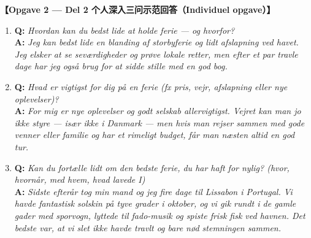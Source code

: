 

\begin{answerbox}
\textbf{\color{NCDRed}【Opgave 2 --- Del 2 个人深入三问示范回答（Individuel opgave）】}
\begin{enumerate}
  \item \textbf{Q:} \textit{Hvordan kan du bedst lide at holde ferie --- og hvorfor?}\\
  \textbf{A:} \textit{Jeg kan bedst lide en blanding af storbyferie og lidt afslapning ved havet. Jeg elsker at se seværdigheder og prøve lokale retter, men efter et par travle dage har jeg også brug for at sidde stille med en god bog.}
  \item \textbf{Q:} \textit{Hvad er vigtigst for dig på en ferie (fx pris, vejr, afslapning eller nye oplevelser)?}\\
  \textbf{A:} \textit{For mig er nye oplevelser og godt selskab allervigtigst. Vejret kan man jo ikke styre --- især ikke i Danmark --- men hvis man rejser sammen med gode venner eller familie og har et rimeligt budget, får man næsten altid en god tur.}
  \item \textbf{Q:} \textit{Kan du fortælle lidt om den bedste ferie, du har haft for nylig? (hvor, hvornår, med hvem, hvad lavede I)}\\
  \textbf{A:} \textit{Sidste efterår tog min mand og jeg fire dage til Lissabon i Portugal. Vi havde fantastisk solskin på tyve grader i oktober, og vi gik rundt i de gamle gader med sporvogn, lyttede til fado-musik og spiste frisk fisk ved havnen. Det bedste var, at vi slet ikke havde travlt og bare nød stemningen sammen.}
\end{enumerate}
\end{answerbox}
